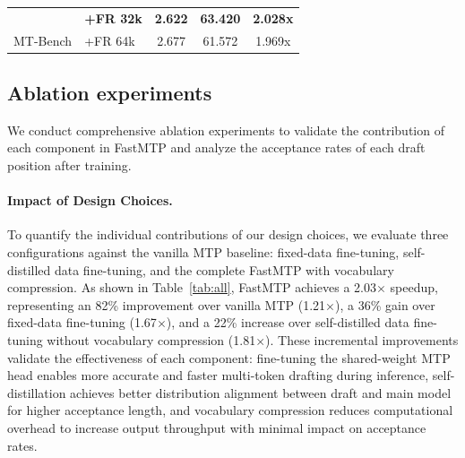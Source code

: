 \documentclass{article} %
\begin{document}
\begin{table}[htbp]
\begin{tabular}{clccc}
                           & \cellcolor[HTML]{E5F6FF}\textbf{+FR 32k} & \cellcolor[HTML]{E5F6FF}\textbf{2.622} & \cellcolor[HTML]{E5F6FF}\textbf{63.420} & \cellcolor[HTML]{E5F6FF}\textbf{2.028x} \\
\multirow{-6}{*}{MT-Bench} & +FR 64k                                  & 2.677                                  & 61.572                                  & 1.969x     \\ \bottomrule                             
\end{tabular}
\end{table}

\subsection{Ablation experiments}

We conduct comprehensive ablation experiments to validate the contribution of each component in FastMTP and analyze the acceptance rates of each draft position after training.

\paragraph{Impact of Design Choices.} To quantify the individual contributions of our design choices, we evaluate three configurations against the vanilla MTP baseline: fixed-data fine-tuning, self-distilled data fine-tuning, and the complete FastMTP with vocabulary compression. As shown in Table~\ref{tab:all}, FastMTP achieves a 2.03$\times$ speedup, representing an 82\% improvement over vanilla MTP (1.21$\times$), a 36\% gain over fixed-data fine-tuning (1.67$\times$), and a 22\% increase over self-distilled data fine-tuning without vocabulary compression (1.81$\times$). These incremental improvements validate the effectiveness of each component: fine-tuning the shared-weight MTP head enables more accurate and faster multi-token drafting during inference, self-distillation achieves better distribution alignment between draft and main model for higher acceptance length, and vocabulary compression reduces computational overhead to increase output throughput with minimal impact on acceptance rates.
\end{document}
